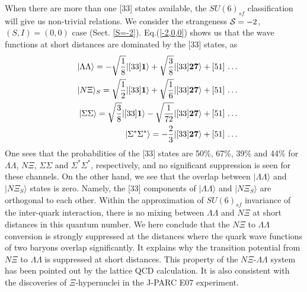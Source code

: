 \documentclass[aps,prd,showpacs,floatfix,reprint,nofootinbib]{revtex4-1}
\newcommand \cc[1]{{\bm {#1}}}
\begin{document}
\bigbreak
When there are more than one [33] states available, the $SU(6)_{sf}$ classification will give us non-trivial relations.
We consider the strangeness ${\cal S}=-2$, $(S, I)=(0,0)$ case (Sect. \ref{S=-2}). Eq.(\ref{-2,0,0}) shows us that the wave functions at short
distances are dominated by the [33] states, as
\begin{eqnarray}
&& |\Lambda\Lambda\rangle = -\sqrt{\frac{1}{8}} |[33] \cc{1}\rangle + \sqrt{\frac{3}{8}} |[33] \cc{27}\rangle + \hbox{[51] \ldots}\\
&& |N\Xi\rangle_S =\sqrt{\frac{1}{2}} |[33] \cc{1}\rangle +\sqrt{\frac{1}{6}} |[33] \cc{27}\rangle + \hbox{[51] \ldots}\\
&&  |\Sigma\Sigma\rangle = \sqrt{\frac{3}{8}} |[33] \cc{1}\rangle - \sqrt{\frac{1}{72}}  |[33] \cc{27}\rangle + \hbox{[51] \ldots}\\
&&  |\Sigma^*\Sigma^*\rangle =  - \frac{2}{3}  |[33] \cc{27}\rangle + \hbox{[51] \ldots}
\end{eqnarray}
One sees that the probabilities of the [33] states are 50\%, 67\%, 39\% and 44\% for $\Lambda\Lambda$, $N\Xi$, $\Sigma\Sigma$
and $\Sigma^*\Sigma^*$, respectively, and no significant suppression is seen for these channels.
On the other hand, we see that the overlap between $|\Lambda\Lambda\rangle$ and $|N\Xi_S\rangle$ states is zero.
Namely, the [33] components of $|\Lambda\Lambda\rangle$ and $|N\Xi_S\rangle$ are orthogonal to each other.
Within the approximation of $SU(6)_{sf}$ invariance of the inter-quark interaction, 
there is no mixing between $\Lambda\Lambda$ and $N\Xi$ at short distances in this quantum number.
We here conclude that the $N\Xi$ to $\Lambda\Lambda$ conversion is strongly suppressed at
the distances where the quark wave functions of two baryons overlap significantly. 
It explains why the transition potential from $N\Xi$ to $\Lambda\Lambda$ is suppressed at short distances. 
This property of the $N\Xi$-$\Lambda\Lambda$ system has been pointed out by the lattice
QCD calculation\cite{XiN-LL conversion}. 
It is also consistent with the discoveries of $\Xi$-hypernuclei in the J-PARC E07
experiment\cite{Xi-exp,Hiyama-Nakazawa}.
\end{document}
